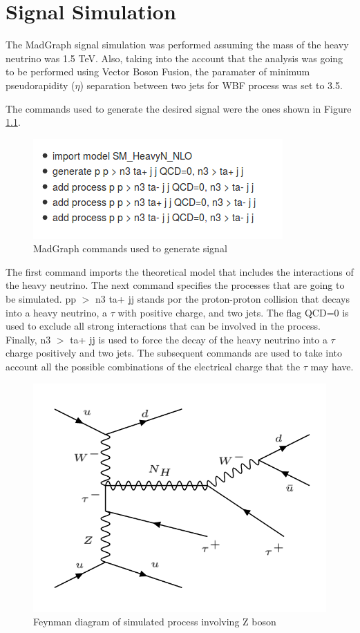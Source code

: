 \chapter{Signal Simulation} \label{sec: mgsim}

The MadGraph signal simulation was performed assuming the mass of the heavy neutrino was 1.5 TeV. Also, taking into the account that the analysis was going to be performed using Vector Boson Fusion, the paramater of minimum pseudorapidity ($\eta$) separation between two jets for WBF process was set to 3.5.

The commands used to generate the desired signal were the ones shown in Figure \ref{fig: mgCommands}.

\begin{figure}[H]
\centering
\includegraphics[scale = 1]{Figures/mg_commands}
\caption{MadGraph commands used to generate signal}
\label{fig: mgCommands}
\end{figure}

The first command imports the theoretical model that includes the interactions of the heavy neutrino. The next command specifies the processes that are going to be simulated. pp $>$ n3 ta+ jj stands por the proton-proton collision that decays into a heavy neutrino, a $\tau$ with positive charge, and two jets. The flag QCD=0 is used to exclude all strong interactions that can be involved in the process. Finally, n3 $>$ ta+ jj is used to force the decay of the heavy neutrino into a $\tau$ charge positively and two jets. The subsequent commands are used to take into account all the possible combinations of the electrical charge that the $\tau$ may have.

\begin{figure}[H]
\centering
\includegraphics[scale = 0.45]{Figures/Feynman_hnZ}
\caption{Feynman diagram of simulated process involving Z boson}
\label{fig: hnZ}
\end{figure}

